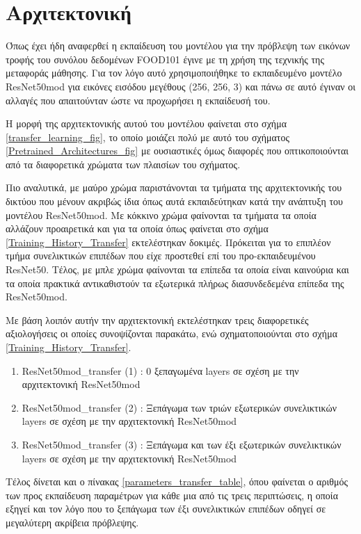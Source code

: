 \vspace{-2em}
\section{Αρχιτεκτονική}
\label{ArchitectureUsed_transfer}

Όπως έχει ήδη αναφερθεί η εκπαίδευση του μοντέλου για την πρόβλεψη των εικόνων τροφής του συνόλου δεδομένων FOOD101 έγινε με τη χρήση της τεχνικής της μεταφοράς μάθησης. Για τον λόγο αυτό χρησιμοποιήθηκε το εκπαιδευμένο μοντέλο ResNet50mod για εικόνες εισόδου μεγέθους (256, 256, 3) και πάνω σε αυτό έγιναν οι αλλαγές που απαιτούνταν ώστε να προχωρήσει η εκπαίδευσή του.

Η μορφή της αρχιτεκτονικής αυτού του μοντέλου φαίνεται στο σχήμα \ref{transfer_learning_fig}, το οποίο μοιάζει πολύ με αυτό του σχήματος \ref{Pretrained_Architectures_fig} με ουσιαστικές όμως διαφορές που οπτικοποιούνται από τα διαφορετικά χρώματα των πλαισίων του σχήματος.  

Πιο αναλυτικά, με μαύρο χρώμα παριστάνονται τα τμήματα της αρχιτεκτονικής του δικτύου που μένουν ακριβώς ίδια όπως αυτά εκπαιδεύτηκαν κατά την ανάπτυξη του μοντέλου ResNet50mod. Με κόκκινο χρώμα φαίνονται τα τμήματα τα οποία αλλάζουν προαιρετικά και για τα οποία όπως φαίνεται στο σχήμα \ref{Training_History_Transfer} εκτελέστηκαν δοκιμές. Πρόκειται για το επιπλέον τμήμα συνελικτικών επιπέδων που είχε προστεθεί επί του προ-εκπαιδευμένου ResNet50. Τέλος, με μπλε χρώμα φαίνονται τα επίπεδα τα οποία είναι καινούρια και τα οποία πρακτικά αντικαθιστούν τα εξωτερικά πλήρως διασυνδεδεμένα επίπεδα της ResNet50mod.  

Με βάση λοιπόν αυτήν την αρχιτεκτονική εκτελέστηκαν τρεις διαφορετικές αξιολογήσεις οι οποίες συνοψίζονται παρακάτω, ενώ σχηματοποιούνται στο σχήμα \ref{Training_History_Transfer}.

\begin{enumerate}
\item ResNet50mod\_transfer (1) : 0 ξεπαγωμένα layers σε σχέση με την αρχιτεκτονική ResNet50mod
\item ResNet50mod\_transfer (2) : Ξεπάγωμα των τριών εξωτερικών συνελικτικών layers σε σχέση με την αρχιτεκτονική ResNet50mod
\item ResNet50mod\_transfer (3) : Ξεπάγωμα και των έξι εξωτερικών συνελικτικών layers σε σχέση με την αρχιτεκτονική ResNet50mod
\end{enumerate}

Τέλος δίνεται και ο πίνακας \ref{parameters_transfer_table}, όπου φαίνεται ο αριθμός των προς εκπαίδευση παραμέτρων για κάθε μια από τις τρεις περιπτώσεις, η οποία εξηγεί και τον λόγο που το ξεπάγωμα των έξι συνελικτικών επιπέδων οδηγεί σε μεγαλύτερη ακρίβεια πρόβλεψης.

